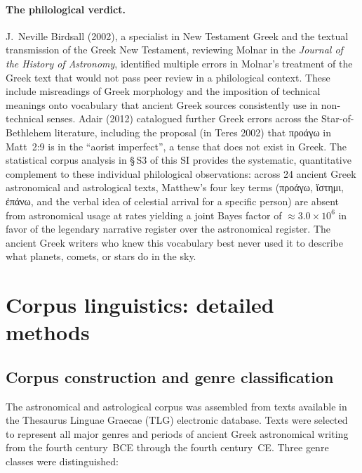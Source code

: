 \documentclass[11pt,a4paper]{article}
\newcommand{\grk}[1]{{\fontencoding{LGR}\selectfont #1}}
\newcommand{\grk}[1]{{\greekfont #1}}
\begin{document}
\paragraph{The philological verdict.}
J.~Neville Birdsall (2002)\cite{birdsall2002}, a specialist in New Testament Greek and
the textual transmission of the Greek New Testament, reviewing Molnar in the
\textit{Journal of the History of Astronomy}, identified multiple errors in Molnar's
treatment of the Greek text that would not pass peer review in a philological context.
These include misreadings of Greek morphology and the imposition of technical meanings
onto vocabulary that ancient Greek sources consistently use in non-technical senses.
Adair (2012)\cite{adair2012} catalogued further Greek errors across the Star-of-Bethlehem
literature, including the proposal (in Teres 2002) that \grk{προάγω} in Matt~2:9 is in
the ``aorist imperfect'', a tense that does not exist in Greek. The statistical corpus
analysis in §\,S3 of this SI provides the systematic, quantitative complement to these
individual philological observations: across 24 ancient Greek astronomical and astrological
texts, Matthew's four key terms (\grk{προάγω}, \grk{ἵστημι}, \grk{ἐπάνω}, and the verbal
idea of celestial arrival for a specific person) are absent from astronomical usage at
rates yielding a joint Bayes factor of ${\approx}3.0\times10^{6}$ in favor of the legendary
narrative register over the astronomical register. The ancient Greek writers who knew
this vocabulary best never used it to describe what planets, comets, or stars do in the
sky.


\section{Corpus linguistics: detailed methods}

\subsection{Corpus construction and genre classification}

The astronomical and astrological corpus was assembled from texts available
in the Thesaurus Linguae Graecae (TLG) electronic database\cite{tlg}. Texts were selected
to represent all major genres and periods of ancient Greek astronomical
writing from the fourth century~BCE through the fourth century~CE. Three
genre classes were distinguished:
\end{document}
